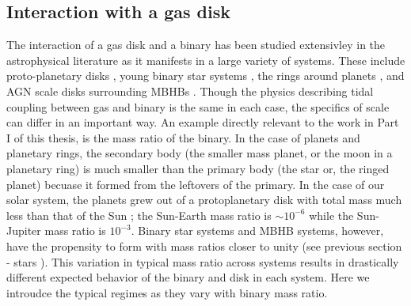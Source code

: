 	


\subsection{Interaction with a gas disk}   The interaction of a gas disk and a
binary has been studied extensivley in the astrophysical literature as it
manifests in a large variety of systems. These include proto-planetary disks
\citep{}, young binary star systems \citep{}, the rings around planets
\citep{GTSaturn}, and AGN scale disks surrounding MBHBs \citep{}. Though the
physics describing tidal coupling between gas and binary is the same in each
case, the specifics of scale can differ in an important way.  An example
directly relevant to the work in Part I of this thesis, is the mass ratio of
the binary. In the case of planets and planetary rings, the secondary body
(the smaller mass planet, or the moon in a planetary ring) is much smaller
than the primary body (the star or, the ringed planet) becuase it formed from
the leftovers of the primary. In the case of our solar system, the planets
grew out of a protoplanetary disk with total mass much less than that of the
Sun \citep{}; the Sun-Earth mass ratio is $\sim10^{-6}$ while the Sun-Jupiter
mass ratio is $10^{-3}$. Binary star systems and MBHB systems, however, have
the propensity to form with mass ratios closer to unity (see previous section
- stars \citep{}). This variation in typical mass ratio across systems results
in drastically different expected behavior of the binary and disk in each
system. Here we introudce the typical regimes as they vary with binary mass
ratio.

